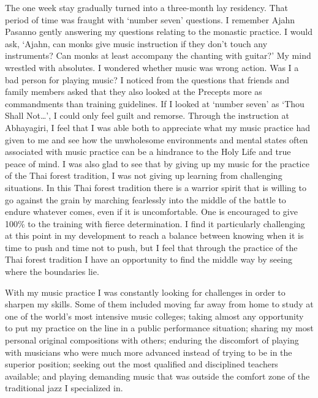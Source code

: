 The one week stay gradually turned into a three-month lay residency.
That period of time was fraught with `number seven' questions. I
remember Ajahn Pasanno gently answering my questions relating to the
monastic practice. I would ask, `Ajahn, can monks give music instruction
if they don't touch any instruments? Can monks at least accompany the
chanting with guitar?' My mind wrestled with absolutes. I wondered
whether music was wrong action. Was I a bad person for playing music? I
noticed from the questions that friends and family members asked that
they also looked at the Precepts more as commandments than training
guidelines. If I looked at `number seven' as `Thou Shall Not\ldots{}', I
could only feel guilt and remorse. Through the instruction at
Abhayagiri, I feel that I was able both to appreciate what my music
practice had given to me and see how the unwholesome environments and
mental states often associated with music practice can be a hindrance to
the Holy Life and true peace of mind. I was also glad to see that by
giving up my music for the practice of the Thai forest tradition, I was
not giving up learning from challenging situations. In this Thai forest
tradition there is a warrior spirit that is willing to go against the
grain by marching fearlessly into the middle of the battle to endure
whatever comes, even if it is uncomfortable. One is encouraged to give
100\% to the training with fierce determination. I find it particularly
challenging at this point in my development to reach a balance between
knowing when it is time to push and time not to push, but I feel that
through the practice of the Thai forest tradition I have an opportunity
to find the middle way by seeing where the boundaries lie.

With my music practice I was constantly looking for challenges in order
to sharpen my skills. Some of them included moving far away from home to
study at one of the world's most intensive music colleges; taking almost
any opportunity to put my practice on the line in a public performance
situation; sharing my most personal original compositions with others;
enduring the discomfort of playing with musicians who were much more
advanced instead of trying to be in the superior position; seeking out
the most qualified and disciplined teachers available; and playing
demanding music that was outside the comfort zone of the traditional
jazz I specialized in.

